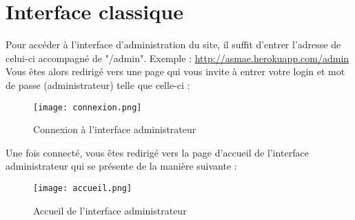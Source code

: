 \section{Interface classique}

Pour accéder à l’interface d’administration du site, il suffit d’entrer l’adresse de celui-ci accompagné de "/admin". Exemple : \href{http://asmae.herokuapp.com/admin}{http://asmae.herokuapp.com/admin}\\
Vous êtes alors redirigé vers une page qui vous invite à entrer votre login et mot de passe (administrateur) telle que celle-ci :

\begin{figure}[H]
\centering
\texttt{[image: connexion.png]}
\caption{Connexion à l'interface administrateur}
\end{figure}

Une fois connecté, vous êtes redirigé vers la page d'accueil de l'interface administrateur qui se présente de la manière suivante :

\begin{figure}[H]
\centering
\texttt{[image: accueil.png]}
\caption{Accueil de l'interface administrateur}
\end{figure}

